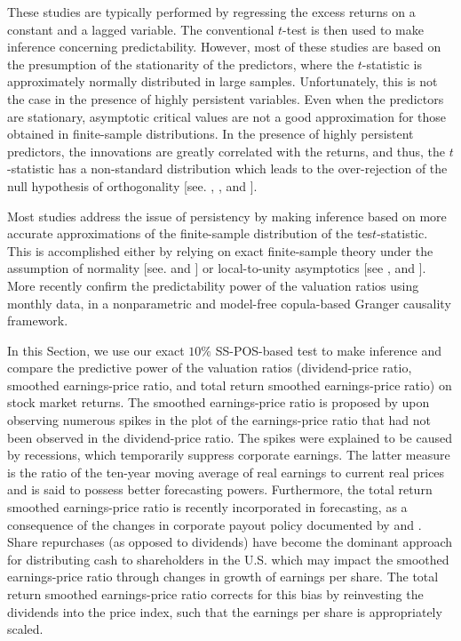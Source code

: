 \documentclass[harvard,11pt]{article}
\begin{document}
These studies are typically performed by regressing the excess returns on a constant and a lagged variable. The conventional $t$-test is then used to make inference concerning predictability. However, most of these studies are based on the presumption of the stationarity of the predictors, where the $t$-statistic is approximately normally distributed in large samples. Unfortunately, this is not the case in the presence of highly persistent variables. Even when the predictors are stationary, asymptotic critical values are not a good approximation for those obtained in finite-sample distributions. In the presence of highly persistent predictors, the innovations are greatly correlated with the returns, and thus, the $t$-statistic has a non-standard distribution which leads to the over-rejection of the null hypothesis of orthogonality [see. \citet{elliott1994inference}, \citet{mankiw1986we}, \citet{stambaugh1999predictive} and \citet{campbell2006efficient}].

 Most studies address the issue of persistency by making inference based on more accurate appro\-ximations of the finite-sample distribution of the tes$t$-statistic. This is accomplished either by relying on exact finite-sample theory under the assumption of normality [see. \citet{evans1981calculation,evans1984testing} and \citet{stambaugh1999predictive}] or local-to-unity asymptotics [see \citet{elliott1994inference}, \citet{campbell2006efficient} and \citet{torous2004predicting}]. More recently \citet{taamouti2014nonparametric} confirm the predictability power of the valuation ratios using monthly data, in a nonparametric and model-free copula-based Granger causality framework. 

In this Section, we use our exact $10\%$ SS-POS-based test to make inference and compare the
predictive power of the valuation ratios (dividend-price ratio, smoothed earnings-price ratio, and total return smoothed earnings-price ratio) on stock market returns. The smoothed earnings-price ratio is proposed by \citet{campbell1988dividend,campbell2001valuation} upon observing numerous spikes in the plot of the earnings-price ratio that had not been observed in the dividend-price ratio. The spikes were explained to be caused by recessions, which temporarily suppress corporate earnings. The latter measure is the ratio of the ten-year moving average of real earnings to current real prices and is said to possess better forecasting powers. Furthermore, the total return smoothed earnings-price ratio is recently incorporated in forecasting, as a consequence of the changes in corporate payout policy documented by \citet{bunn2014cape} and \citet{jivraj2017many}. Share repurchases (as opposed to dividends) have become the dominant approach for distributing cash to shareholders in the U.S. which may impact the smoothed earnings-price ratio through changes in growth of earnings per share. The total return smoothed earnings-price ratio corrects for this bias by reinvesting the dividends into the price index, such that the earnings per share is appropriately scaled. 
\end{document}
